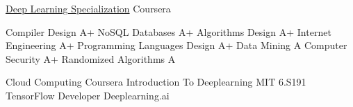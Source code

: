 


\begin{cvcourses}
\cvcourse
{\href{https://www.coursera.org/account/accomplishments/specialization/certificate/T9ULQAUEZ68D}{Deep Learning Specialization}}
{Coursera}
\end{cvcourses}




\begin{cvcourses}

\cvcourse
{Compiler Design} %
{A+} %
\cvcourse
{NoSQL Databases} %
{A+} %
\cvcourse
{Algorithms Design} %
{A+} %
\cvcourse
{Internet Engineering} %
{A+} %
\cvcourse
{Programming Languages Design} %
{A+} %
\cvcourse
{Data Mining} %
{A} %
\cvcourse
{Computer Security} %
{A+} %
\cvcourse
{Randomized Algorithms} %
{A} %
\end{cvcourses}

\begin{cvcourses}
\cvcourse
{Cloud Computing} %
{Coursera} %
\cvcourse
{Introduction To Deeplearning} %
{MIT 6.S191} %
\cvcourse
{TensorFlow Developer} %
{Deeplearning.ai} %
\end{cvcourses}
